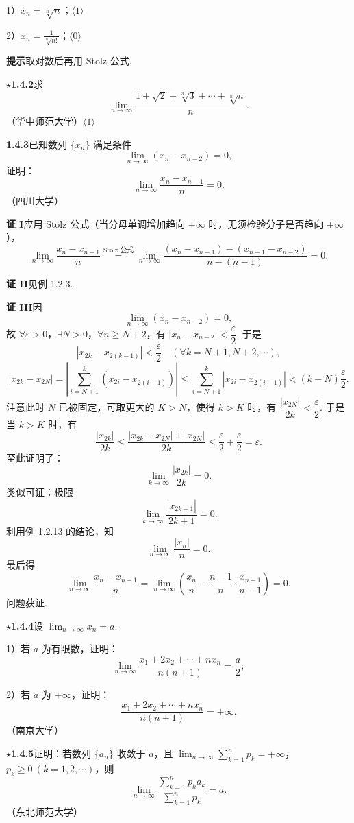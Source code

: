\documentclass[UTF8,12pt,a4paper,fontset=fandol]{ctexart}
\begin{document}
1）$x_n=\sqrt[n]{n}$；\quad $\langle1\rangle$

2）$\displaystyle x_n=\frac1{\sqrt[n]{n!}}$；\quad $\langle0\rangle$

\noindent\textbf{提示}\quad 取对数后再用 Stolz 公式.

\noindent\textbf{$\star$1.4.2}\quad 求
\[
  \lim_{n\to\infty}\frac{1+\sqrt2+\sqrt[3]3+\cdots+\sqrt[n]n}{n}.
\]
（华中师范大学）\quad $\langle1\rangle$

\noindent\textbf{1.4.3}\quad 已知数列 $\{x_n\}$ 满足条件
\[
  \lim_{n\to\infty}(x_n-x_{n-2})=0,
\]
证明：
\[
  \lim_{n\to\infty}\frac{x_n-x_{n-1}}n=0.
\]
（四川大学）

\noindent\textbf{证 I}\quad 应用 Stolz 公式（当分母单调增加趋向 $+\infty$ 时，无须检验分子是否趋向 $+\infty$），
\[
  \lim_{n\to\infty}\frac{x_n-x_{n-1}}n
  \overset{\text{Stolz 公式}}{=}
  \lim_{n\to\infty}\frac{(x_n-x_{n-1})-(x_{n-1}-x_{n-2})}{n-(n-1)}
  =0.
\]

\noindent\textbf{证 II}\quad 见例 1.2.3.

\noindent\textbf{证 III}\quad 因
\[
  \lim_{n\to\infty}(x_n-x_{n-2})=0,
\]
故 $\forall\varepsilon>0$，$\exists N>0$，$\forall n\ge N+2$，有
$|x_n-x_{n-2}|<\dfrac\varepsilon2$. 于是
\[
  |x_{2k}-x_{2(k-1)}|<\frac\varepsilon2
  \quad(\forall k=N+1,N+2,\cdots),
\]
\[
  |x_{2k}-x_{2N}|
  =\left|\sum_{i=N+1}^k(x_{2i}-x_{2(i-1)})\right|
  \le\sum_{i=N+1}^k|x_{2i}-x_{2(i-1)}|
  <(k-N)\frac\varepsilon2.
\]
注意此时 $N$ 已被固定，可取更大的 $K>N$，使得 $k>K$ 时，有
$\dfrac{|x_{2N}|}{2k}<\dfrac\varepsilon2$. 于是当 $k>K$ 时，有
\[
  \frac{|x_{2k}|}{2k}
  \le\frac{|x_{2k}-x_{2N}|+|x_{2N}|}{2k}
  \le\frac\varepsilon2+\frac\varepsilon2=\varepsilon.
\]
至此证明了：
\[
  \lim_{k\to\infty}\frac{|x_{2k}|}{2k}=0.
\]
类似可证：极限
\[
  \lim_{k\to\infty}\frac{|x_{2k+1}|}{2k+1}=0.
\]
利用例 1.2.13 的结论，知
\[
  \lim_{n\to\infty}\frac{|x_n|}{n}=0.
\]
最后得
\[
  \lim_{n\to\infty}\frac{x_n-x_{n-1}}n
  =\lim_{n\to\infty}\left(\frac{x_n}{n}-\frac{n-1}{n}\cdot\frac{x_{n-1}}{n-1}\right)=0.
\]
问题获证.

\noindent\textbf{$\star$1.4.4}\quad 设 $\displaystyle\lim_{n\to\infty}x_n=a$.

1）若 $a$ 为有限数，证明：
\[
  \lim_{n\to\infty}\frac{x_1+2x_2+\cdots+nx_n}{n(n+1)}=\frac a2;
\]

2）若 $a$ 为 $+\infty$，证明：
\[
  \frac{x_1+2x_2+\cdots+nx_n}{n(n+1)}=+\infty.
\]
（南京大学）

\noindent\textbf{$\star$1.4.5}\quad 证明：若数列 $\{a_n\}$ 收敛于 $a$，且
$\displaystyle\lim_{n\to\infty}\sum_{k=1}^n p_k=+\infty$，$p_k\ge0\ (k=1,2,\cdots)$，则
\[
  \lim_{n\to\infty}
  \frac{\displaystyle\sum_{k=1}^n p_ka_k}
  {\displaystyle\sum_{k=1}^n p_k}=a.
\]
（东北师范大学）
\end{document}
